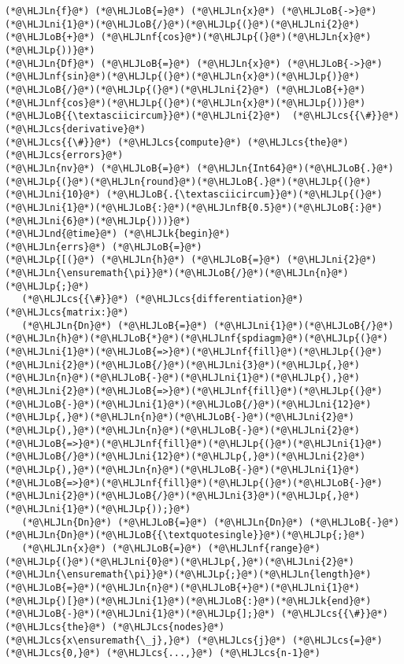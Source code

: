 \documentclass[12pt,a4paper]{article}
\newcommand{\HLJLk}[1]{\textcolor[RGB]{148,91,176}{\textbf{#1}}}
\newcommand{\HLJLn}[1]{#1}
\newcommand{\HLJLnd}[1]{\textcolor[RGB]{214,102,97}{#1}}
\newcommand{\HLJLnf}[1]{\textcolor[RGB]{66,102,213}{#1}}
\newcommand{\HLJLnfB}[1]{\textcolor[RGB]{59,151,46}{#1}}
\newcommand{\HLJLni}[1]{\textcolor[RGB]{59,151,46}{#1}}
\newcommand{\HLJLoB}[1]{\textcolor[RGB]{102,102,102}{\textbf{#1}}}
\newcommand{\HLJLp}[1]{#1}
\newcommand{\HLJLcs}[1]{\textcolor[RGB]{153,153,119}{\textit{#1}}}
\begin{document}
\begin{lstlisting}
(*@\HLJLn{f}@*) (*@\HLJLoB{=}@*) (*@\HLJLn{x}@*) (*@\HLJLoB{->}@*) (*@\HLJLni{1}@*)(*@\HLJLoB{/}@*)(*@\HLJLp{(}@*)(*@\HLJLni{2}@*) (*@\HLJLoB{+}@*) (*@\HLJLnf{cos}@*)(*@\HLJLp{(}@*)(*@\HLJLn{x}@*)(*@\HLJLp{))}@*)
(*@\HLJLn{Df}@*) (*@\HLJLoB{=}@*) (*@\HLJLn{x}@*) (*@\HLJLoB{->}@*) (*@\HLJLnf{sin}@*)(*@\HLJLp{(}@*)(*@\HLJLn{x}@*)(*@\HLJLp{)}@*)(*@\HLJLoB{/}@*)(*@\HLJLp{(}@*)(*@\HLJLni{2}@*) (*@\HLJLoB{+}@*) (*@\HLJLnf{cos}@*)(*@\HLJLp{(}@*)(*@\HLJLn{x}@*)(*@\HLJLp{))}@*)(*@\HLJLoB{{\textasciicircum}}@*)(*@\HLJLni{2}@*)  (*@\HLJLcs{{\#}}@*) (*@\HLJLcs{derivative}@*)
(*@\HLJLcs{{\#}}@*) (*@\HLJLcs{compute}@*) (*@\HLJLcs{the}@*) (*@\HLJLcs{errors}@*)
(*@\HLJLn{nv}@*) (*@\HLJLoB{=}@*) (*@\HLJLn{Int64}@*)(*@\HLJLoB{.}@*)(*@\HLJLp{(}@*)(*@\HLJLn{round}@*)(*@\HLJLoB{.}@*)(*@\HLJLp{(}@*)(*@\HLJLni{10}@*) (*@\HLJLoB{.{\textasciicircum}}@*)(*@\HLJLp{(}@*)(*@\HLJLni{1}@*)(*@\HLJLoB{:}@*)(*@\HLJLnfB{0.5}@*)(*@\HLJLoB{:}@*)(*@\HLJLni{6}@*)(*@\HLJLp{)))}@*)
(*@\HLJLnd{@time}@*) (*@\HLJLk{begin}@*)
(*@\HLJLn{errs}@*) (*@\HLJLoB{=}@*) 
(*@\HLJLp{[(}@*) (*@\HLJLn{h}@*) (*@\HLJLoB{=}@*) (*@\HLJLni{2}@*)(*@\HLJLn{\ensuremath{\pi}}@*)(*@\HLJLoB{/}@*)(*@\HLJLn{n}@*)(*@\HLJLp{;}@*)
   (*@\HLJLcs{{\#}}@*) (*@\HLJLcs{differentiation}@*) (*@\HLJLcs{matrix:}@*)
   (*@\HLJLn{Dn}@*) (*@\HLJLoB{=}@*) (*@\HLJLni{1}@*)(*@\HLJLoB{/}@*)(*@\HLJLn{h}@*)(*@\HLJLoB{*}@*)(*@\HLJLnf{spdiagm}@*)(*@\HLJLp{(}@*)(*@\HLJLni{1}@*)(*@\HLJLoB{=>}@*)(*@\HLJLnf{fill}@*)(*@\HLJLp{(}@*)(*@\HLJLni{2}@*)(*@\HLJLoB{/}@*)(*@\HLJLni{3}@*)(*@\HLJLp{,}@*)(*@\HLJLn{n}@*)(*@\HLJLoB{-}@*)(*@\HLJLni{1}@*)(*@\HLJLp{),}@*)(*@\HLJLni{2}@*)(*@\HLJLoB{=>}@*)(*@\HLJLnf{fill}@*)(*@\HLJLp{(}@*)(*@\HLJLoB{-}@*)(*@\HLJLni{1}@*)(*@\HLJLoB{/}@*)(*@\HLJLni{12}@*)(*@\HLJLp{,}@*)(*@\HLJLn{n}@*)(*@\HLJLoB{-}@*)(*@\HLJLni{2}@*)(*@\HLJLp{),}@*)(*@\HLJLn{n}@*)(*@\HLJLoB{-}@*)(*@\HLJLni{2}@*)(*@\HLJLoB{=>}@*)(*@\HLJLnf{fill}@*)(*@\HLJLp{(}@*)(*@\HLJLni{1}@*)(*@\HLJLoB{/}@*)(*@\HLJLni{12}@*)(*@\HLJLp{,}@*)(*@\HLJLni{2}@*)(*@\HLJLp{),}@*)(*@\HLJLn{n}@*)(*@\HLJLoB{-}@*)(*@\HLJLni{1}@*)(*@\HLJLoB{=>}@*)(*@\HLJLnf{fill}@*)(*@\HLJLp{(}@*)(*@\HLJLoB{-}@*)(*@\HLJLni{2}@*)(*@\HLJLoB{/}@*)(*@\HLJLni{3}@*)(*@\HLJLp{,}@*)(*@\HLJLni{1}@*)(*@\HLJLp{));}@*)
   (*@\HLJLn{Dn}@*) (*@\HLJLoB{=}@*) (*@\HLJLn{Dn}@*) (*@\HLJLoB{-}@*) (*@\HLJLn{Dn}@*)(*@\HLJLoB{{\textquotesingle}}@*)(*@\HLJLp{;}@*)
   (*@\HLJLn{x}@*) (*@\HLJLoB{=}@*) (*@\HLJLnf{range}@*)(*@\HLJLp{(}@*)(*@\HLJLni{0}@*)(*@\HLJLp{,}@*)(*@\HLJLni{2}@*)(*@\HLJLn{\ensuremath{\pi}}@*)(*@\HLJLp{;}@*)(*@\HLJLn{length}@*)(*@\HLJLoB{=}@*)(*@\HLJLn{n}@*)(*@\HLJLoB{+}@*)(*@\HLJLni{1}@*)(*@\HLJLp{)[}@*)(*@\HLJLni{1}@*)(*@\HLJLoB{:}@*)(*@\HLJLk{end}@*)(*@\HLJLoB{-}@*)(*@\HLJLni{1}@*)(*@\HLJLp{];}@*) (*@\HLJLcs{{\#}}@*) (*@\HLJLcs{the}@*) (*@\HLJLcs{nodes}@*) (*@\HLJLcs{x\ensuremath{\_j},}@*) (*@\HLJLcs{j}@*) (*@\HLJLcs{=}@*) (*@\HLJLcs{0,}@*) (*@\HLJLcs{...,}@*) (*@\HLJLcs{n-1}@*)

\end{lstlisting}
\end{document}
